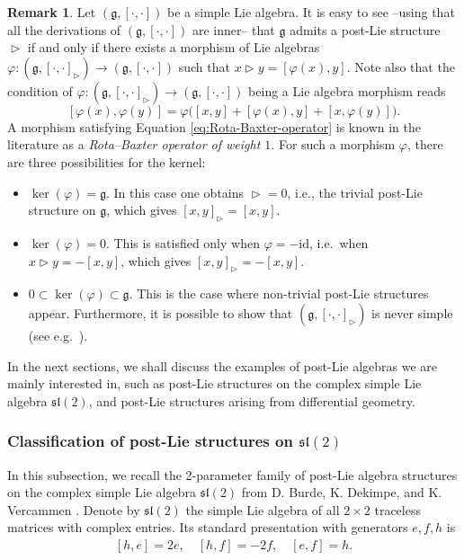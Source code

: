 \documentclass[10pt]{article}
\theoremstyle{definition}
\newtheorem{remark}[lemma]{Remark}
\newcommand{\g}{\mathfrak{g}}
\newcommand{\wt}{\vartriangleright}
\newcommand{\s}{\mathfrak{s}}
\renewcommand{\l}{\mathfrak{l}}
\begin{document}
\begin{remark}
\label{remark-simple}
Let $(\g, [\cdot,\cdot])$ be a simple Lie algebra. It is easy to see --using that all the derivations of $(\mathfrak{g},[\cdot,\cdot])$ are inner-- that $\g$ admits a post-Lie structure $\wt$ if and only if there exists a morphism of Lie algebras $\varphi: (\g,[\cdot,\cdot]_\wt) \to (\g, [\cdot,\cdot])$ such that $x \wt y = [\varphi(x),y]$. Note also that the condition of $\varphi: (\g,[\cdot,\cdot]_\wt) \to (\g, [\cdot,\cdot])$ being a Lie algebra morphism reads
\begin{equation}\label{eq:Rota-Baxter-operator}
[\varphi(x), \varphi(y)] = \varphi \big( [x,y] + [\varphi(x), y] + [x,\varphi(y)]\big).
\end{equation}
A morphism satisfying Equation \eqref{eq:Rota-Baxter-operator} is known in the literature as a \emph{Rota--Baxter operator of weight $1$}. For such a morphism $\varphi$, there are three possibilities for the kernel:
\begin{itemize}
\item[(i)] $\ker(\varphi)=\g$. In this case one obtains $\wt = 0$, i.e., the trivial post-Lie structure on $\g$, which gives $[x,y]_\wt=[x,y]$.
\item[(ii)] $\ker(\varphi) = 0$. This is satisfied only when $\varphi = - \mathrm{id}$, i.e.\ when $x \wt y = - [x,y]$, which gives $[x,y]_\wt = -[x,y]$. 
\item[(iii)] $0 \subset \ker(\varphi) \subset\g$. This is the case where non-trivial post-Lie structures appear.  
Furthermore, it is possible to show that $(\g,[\cdot,\cdot]_\wt)$ is never simple (see e.g.\ \cite{BDV}). 
\end{itemize}
\end{remark}


In the next sections, we shall discuss the examples of post-Lie algebras we are mainly interested in, such as post-Lie structures on the complex simple Lie algebra $\s\l(2)$, and post-Lie structures arising from differential geometry.

\subsubsection{Classification of post-Lie structures on $\s\l(2)$}\label{subsec:postLiesl2}
\label{section-post-lie-sl2}
In this subsection, we recall the 2-parameter family of post-Lie algebra structures on the complex simple Lie algebra $\s\l(2)$ from D. Burde, K.  Dekimpe, and  K. Vercammen \cite{BDV}.
Denote by $\s\l(2)$ the simple Lie algebra of all $2 \times 2$ traceless matrices with complex entries. Its standard presentation with generators $e,f,h$ is
\begin{align}
\label{eq:sl2-relations}
[h,e] = 2e, \quad [h,f]= -2f, \quad [e,f]=h.
\end{align}
\end{document}

